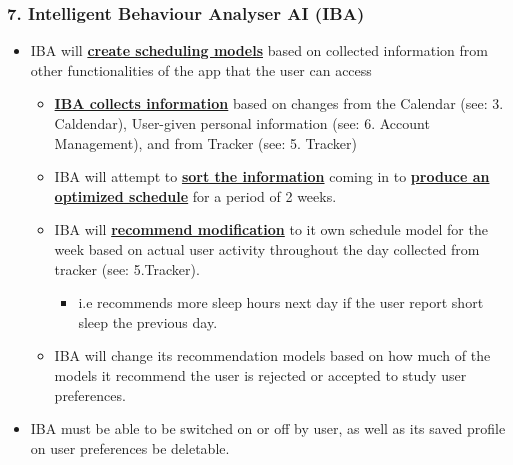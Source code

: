 \documentclass[a4paper,11pt]{article} %
\begin{document}
\subsubsection*{7. Intelligent Behaviour Analyser AI (IBA)}
\begin{itemize}
  \item IBA will \textbf{\ul{create scheduling models}} based on collected information from other functionalities of the app that the user can access
  \begin{itemize}
    \item \textbf{\ul{IBA collects information}} based on changes from the Calendar (see: 3. Caldendar), User-given personal information (see: 6. Account Management), and from Tracker (see: 5. Tracker)
    \item IBA will attempt to \textbf{\ul{sort the information}} coming in to \textbf{\ul{produce an optimized schedule}} for a period of 2 weeks.
    \item IBA will \textbf{\ul{recommend modification}} to it own schedule model for the week based on actual user activity throughout the day collected from tracker (see: 5.Tracker).
    \begin{itemize}
      \item i.e recommends more sleep hours next day if the user report short sleep the previous day.
    \end{itemize} 
    \item IBA will change its recommendation models based on how much of the models it recommend the user is rejected or accepted to study user preferences.
  \end{itemize}
  \item IBA must be able to be switched on or off by user, as well as its saved profile on user preferences be deletable.
\end{itemize}
\end{document}
